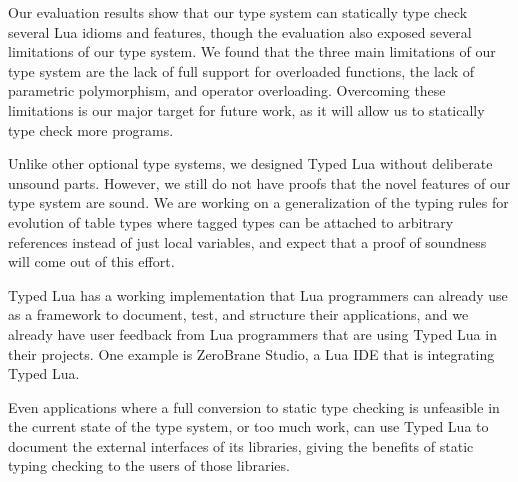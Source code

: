 \documentclass{sigplanconf}
\begin{document}
Our evaluation results show that our type system can statically
type check several Lua idioms and features, though the evaluation
also exposed several limitations of our type system.
We found that the three main limitations of our type system are
the lack of full support for overloaded functions, the lack
of parametric polymorphism, and operator overloading.
Overcoming these limitations is our major target for future work,
as it will allow us to statically type check more programs.

Unlike other optional type systems, we designed Typed Lua without
deliberate unsound parts.
However, we still do not have proofs that the novel features of
our type system are sound. We are working on a generalization
of the typing rules for evolution of table types where tagged
types can be attached to arbitrary references instead of
just local variables, and expect that a proof of soundness
will come out of this effort.

Typed Lua has a working implementation that
Lua programmers can already use as a framework to
document, test, and structure their applications,
and we already have user feedback from Lua programmers
that are using Typed Lua in their projects.
One example is ZeroBrane Studio, a Lua IDE that is
integrating Typed Lua.

Even applications where a full conversion to static
type checking is unfeasible in the current state
of the type system, or too much work, can use Typed
Lua to document the external interfaces of its
libraries, giving the benefits of static typing
checking to the users of those libraries.



\end{document}

